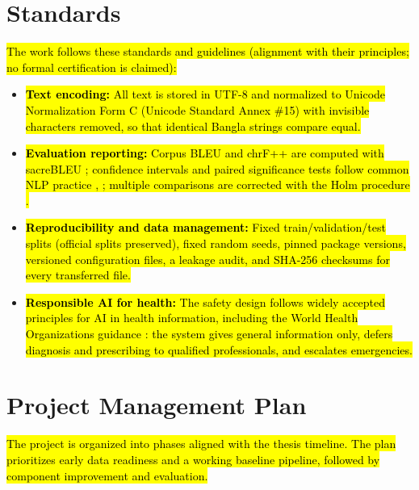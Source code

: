 \section{Standards}\label{standards}

\hl{The work follows these standards and guidelines (alignment with
their principles; no formal certification is claimed):}

\begin{itemize}
\item \hl{\textbf{Text encoding:} All text is stored in UTF-8 and normalized
to Unicode Normalization Form C (Unicode Standard Annex \#15) with
invisible characters removed, so that identical Bangla strings compare
equal.}

\item \hl{\textbf{Evaluation reporting:} Corpus BLEU and chrF++ are computed
with sacreBLEU \cite{post2018sacrebleu}; confidence intervals and paired significance
tests follow common NLP practice \cite{koehn2004bootstrap}, \cite{riezler2005randomization}; multiple
comparisons are corrected with the Holm procedure \cite{holm1979}.}

\item \hl{\textbf{Reproducibility and data management:} Fixed
train/validation/test splits (official splits preserved), fixed random
seeds, pinned package versions, versioned configuration files, a leakage
audit, and SHA-256 checksums for every transferred file.}

\item \hl{\textbf{Responsible AI for health:} The safety design follows
widely accepted principles for AI in health information, including the
World Health Organization\textquotesingle s guidance \cite{who2021ethics}: the
system gives general information only, defers diagnosis and prescribing
to qualified professionals, and escalates emergencies.}
\end{itemize}

\section{Project Management Plan}\label{project-management-plan}

\hl{The project is organized into phases aligned with the thesis
timeline. The plan prioritizes early data readiness and a working
baseline pipeline, followed by component improvement and evaluation.}


